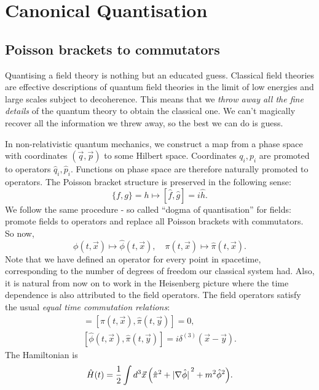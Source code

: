 \documentclass{article}
\begin{document}
\newpage
\section{Canonical Quantisation}
\subsection{Poisson brackets to commutators}
Quantising a field theory is nothing but an educated guess. Classical field theories are effective descriptions of quantum field theories in the limit of low energies and large scales subject to decoherence. This means that we \textit{throw away all the fine details} of the quantum theory to obtain the classical one. We can't magically recover all the information we threw away, so the best we can do is guess. 
\par
In non-relativistic quantum mechanics, we construct a map from a phase space with coordinates $ (\vec{q}, \vec{p}) $ to some Hilbert space. Coordinates $ q_{i}, p_{i} $ are promoted to operators $ \hat{q}_{i}, \hat{p}_{i} $. Functions on phase space are therefore naturally promoted to operators. The Poisson bracket structure is preserved in the following sense:
\begin{equation}
	\{f, g\} = h \longmapsto [\hat{f},\hat{g}] = i\hat{h}.
\end{equation}
We follow the same procedure - so called ``dogma of quantisation'' for fields: promote fields to operators and replace all Poisson brackets with commutators. So now,
\begin{equation}
	\phi(t,\vec{x}) \longmapsto \hat{\phi}(t, \vec{x}), \quad \pi(t,\vec{x}) \longmapsto \hat{\pi}(t,\vec{x}).
\end{equation}
Note that we have defined an operator for every point in spacetime, corresponding to the number of degrees of freedom our classical system had. Also, it is natural from now on to work in the Heisenberg picture where the time dependence is also attributed to the field operators. The field operators satisfy the usual \textit{equal time commutation relations}:
\begin{gather}
	[\hat{\phi}(t,\vec{x}), \hat{\phi}(t,\vec{y})] = [\hat{\pi}(t,\vec{x}), \hat{\pi}(t,\vec{y})] = 0, \\
	[\hat{\phi}(t,\vec{x}), \hat{\pi}(t, \vec{y})] = i \delta^{(3)}(\vec{x} - \vec{y}).
\end{gather}
The Hamiltonian is
\begin{equation} \label{2.5}
	\hat{H}(t) = \frac{1}{2} \int \dd[3]{\vec{x}} \qty(\hat{\pi}^{2} + \abs*{\nabla \hat{\phi}}^{2} + m^{2} \hat{\phi}^{2}).
\end{equation}
\end{document}
